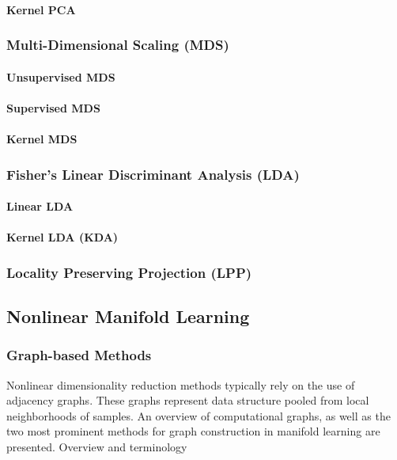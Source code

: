 \paragraph{Kernel PCA}

\subsubsection{Multi-Dimensional Scaling (MDS)}

\paragraph{Unsupervised MDS}

\paragraph{Supervised MDS}

\paragraph{Kernel MDS}

\subsubsection{Fisher's Linear Discriminant Analysis (LDA)}

\paragraph{Linear LDA}

\paragraph{Kernel LDA (KDA)}

\subsubsection{Locality Preserving Projection (LPP)}

\subsection{Nonlinear Manifold Learning}
\subsubsection{Graph-based Methods}
Nonlinear dimensionality reduction methods typically rely on the use of adjacency graphs.  These graphs represent data structure pooled from local neighborhoods of samples.  An overview of computational graphs, as well as the two most prominent methods for graph construction in manifold learning are presented.
Overview and terminology

